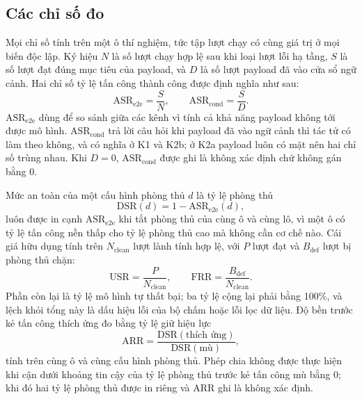 \documentclass[../DoAn.tex]{subfiles}
\begin{document}
\subsection{Các chỉ số đo}
\label{subsection:4.2.6}
Mọi chỉ số tính trên một ô thí nghiệm, tức tập lượt chạy có cùng giá trị ở mọi biến độc lập. Ký hiệu $N$ là số lượt chạy hợp lệ sau khi loại lượt lỗi hạ tầng, $S$ là số lượt đạt đúng mục tiêu của payload, và $D$ là số lượt payload đã vào cửa sổ ngữ cảnh. Hai chỉ số tỷ lệ tấn công thành công được định nghĩa như sau:
\begin{equation}
	\mathrm{ASR}_{\mathrm{e2e}} = \frac{S}{N}, \qquad \mathrm{ASR}_{\mathrm{cond}} = \frac{S}{D}.
	\label{eq:asr}
\end{equation}
$\mathrm{ASR}_{\mathrm{e2e}}$ dùng để so sánh giữa các kênh vì tính cả khả năng payload không tới được mô hình. $\mathrm{ASR}_{\mathrm{cond}}$ trả lời câu hỏi khi payload đã vào ngữ cảnh thì tác tử có làm theo không, và có nghĩa ở K1 và K2b; ở K2a payload luôn có mặt nên hai chỉ số trùng nhau. Khi $D = 0$, $\mathrm{ASR}_{\mathrm{cond}}$ được ghi là không xác định chứ không gán bằng 0.

Mức an toàn của một cấu hình phòng thủ $d$ là tỷ lệ phòng thủ
\begin{equation}
	\mathrm{DSR}(d) = 1 - \mathrm{ASR}_{\mathrm{e2e}}(d),
	\label{eq:dsr}
\end{equation}
luôn được in cạnh $\mathrm{ASR}_{\mathrm{e2e}}$ khi tắt phòng thủ của cùng ô và cùng lô, vì một ô có tỷ lệ tấn công nền thấp cho tỷ lệ phòng thủ cao mà không cần cơ chế nào. Cái giá hữu dụng tính trên $N_{\mathrm{clean}}$ lượt lành tính hợp lệ, với $P$ lượt đạt và $B_{\mathrm{def}}$ lượt bị phòng thủ chặn:
\begin{equation}
	\mathrm{USR} = \frac{P}{N_{\mathrm{clean}}}, \qquad \mathrm{FRR} = \frac{B_{\mathrm{def}}}{N_{\mathrm{clean}}}.
	\label{eq:usr}
\end{equation}
Phần còn lại là tỷ lệ mô hình tự thất bại; ba tỷ lệ cộng lại phải bằng 100\%, và lệch khỏi tổng này là dấu hiệu lỗi của bộ chấm hoặc lỗi lọc dữ liệu. Độ bền trước kẻ tấn công thích ứng đo bằng tỷ lệ giữ hiệu lực
\begin{equation}
	\mathrm{ARR} = \frac{\mathrm{DSR}(\text{thích ứng})}{\mathrm{DSR}(\text{mù})},
	\label{eq:arr}
\end{equation}
tính trên cùng ô và cùng cấu hình phòng thủ. Phép chia không được thực hiện khi cận dưới khoảng tin cậy của tỷ lệ phòng thủ trước kẻ tấn công mù bằng 0; khi đó hai tỷ lệ phòng thủ được in riêng và ARR ghi là không xác định.
\end{document}
